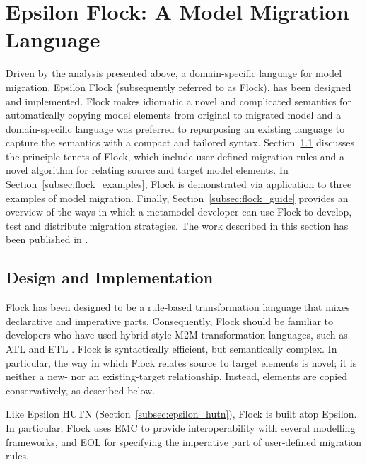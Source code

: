 
\section{Epsilon Flock: A Model Migration Language}
\label{sec:flock}
Driven by the analysis presented above, a domain-specific language for model migration, Epsilon Flock (subsequently referred to as Flock), has been designed and implemented. Flock makes idiomatic a novel and complicated semantics for automatically copying model elements from original to migrated model and a domain-specific language was preferred to repurposing an existing language to capture the semantics with a compact and tailored syntax. Section~\ref{subsec:flock_design} discusses the principle tenets of Flock, which include user-defined migration rules and a novel algorithm for relating source and target model elements. In Section~\ref{subsec:flock_examples}, Flock is demonstrated via application to three examples of model migration. Finally, Section~\ref{subsec:flock_guide} provides an overview of the ways in which a metamodel developer can use Flock to develop, test and distribute migration strategies. The work described in this section has been published in \cite{rose10flock}.

\subsection{Design and Implementation}
\label{subsec:flock_design}
Flock has been designed to be a rule-based transformation language that mixes declarative and imperative parts. Consequently, Flock should be familiar to developers who have used hybrid-style M2M transformation languages, such as ATL and ETL \cite{kolovos08etl}. Flock is syntactically efficient, but semantically complex. In particular, the way in which Flock relates source to target elements is novel; it is neither a new- nor an existing-target relationship. Instead, elements are copied conservatively, as described below.

Like Epsilon HUTN (Section~\ref{subsec:epsilon_hutn}), Flock is built atop Epsilon. In particular, Flock uses EMC to provide interoperability with several modelling frameworks, and EOL for specifying the imperative part of user-defined migration rules.


